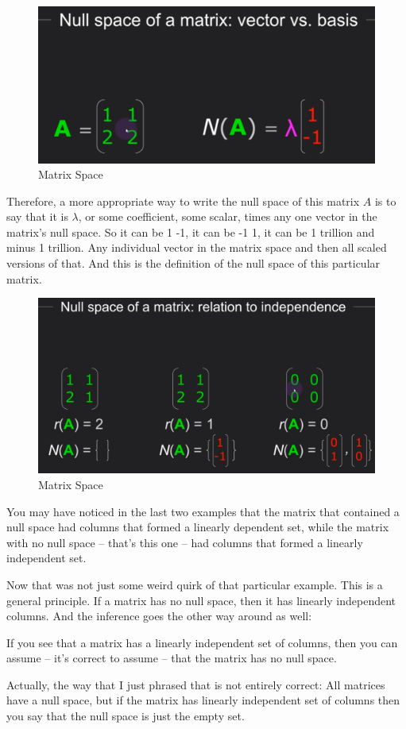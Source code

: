 \documentclass[fleqn,10pt]{olplainarticle}
\theoremstyle{definition}
\theoremstyle{remark}
\begin{document}
\begin{figure}[ht]
	\centering
	\includegraphics[width=0.4\linewidth]{images/matrix-space-21.png}
	\caption{Matrix Space}
	\label{fig:matrix_space_21}
\end{figure}

Therefore, a more appropriate way to write the null space of this matrix $A$ is to say that it is $\lambda$, or some coefficient, some scalar, times any one vector in the matrix's null space. So it can be 1 -1, it can be -1 1, it can be 1 trillion and minus 1 trillion. Any individual vector in the matrix space and then all scaled versions of that. And this is the definition of the null space of this particular matrix.

\begin{figure}[ht]
	\centering
	\includegraphics[width=0.4\linewidth]{images/matrix-space-22.png}
	\caption{Matrix Space}
	\label{fig:matrix_space_22}
\end{figure}

You may have noticed in the last two examples that the matrix that contained a null space had columns that formed a linearly dependent set, while the matrix with no null space -- that's this one -- had columns that formed a linearly independent set.

Now that was not just some weird quirk of that particular example. This is a general principle. If a matrix has no null space, then it has linearly independent columns. And the inference goes the other way around as well:

If you see that a matrix has a linearly independent set of columns, then you can assume -- it's correct to assume -- that the matrix has no null space.

Actually, the way that I just phrased that is not entirely correct: All matrices have a null space, but if the matrix has linearly independent set of columns then you say that the null space is just the empty set.
\end{document}
